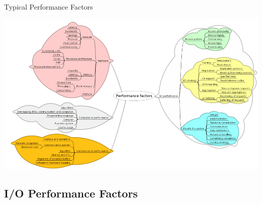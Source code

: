 \documentclass[compress,11pt,xcolor=svgnames,aspectratio=169]{beamer}
\begin{document}
\begin{frame}[fragile]{Typical Performance Factors}

\begin{center}
\includegraphics[scale=0.44]{fig/tree-perf}
\end{center}

\nocite{SOPPOAASLK13}

\end{frame}

\subsection{I/O Performance Factors}
\end{document}

